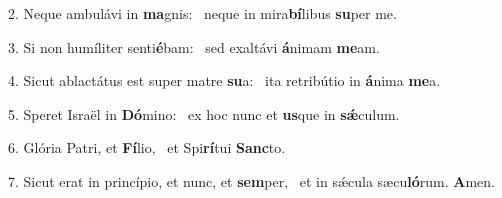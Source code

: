 2. Neque ambulávi in \textbf{ma}gnis: \ast\  neque in mira\textbf{bí}libus \textbf{su}per me.\

3. Si non humíliter senti\textbf{é}bam: \ast\  sed exaltávi \textbf{á}nimam \textbf{me}am.\

4. Sicut ablactátus est super matre \textbf{su}a: \ast\  ita retribútio in \textbf{á}nima \textbf{me}a.\

5. Speret Israël in \textbf{Dó}mino: \ast\  ex hoc nunc et \textbf{us}que in \textbf{sǽ}culum.\

6. Glória Patri, et \textbf{Fí}lio, \ast\  et Spi\textbf{rí}tui \textbf{Sanc}to.\

7. Sicut erat in princípio, et nunc, et \textbf{sem}per, \ast\  et in sǽcula sæcu\textbf{ló}rum. \textbf{A}men.\

